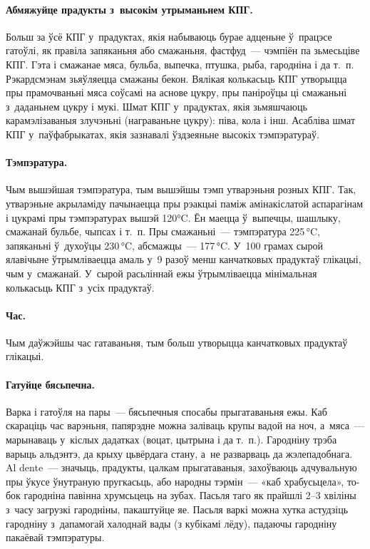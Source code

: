 \paragraph{Абмяжуйце прадукты з~высокім утрыманьнем КПГ.}
Больш за ўсё КПГ у~прадуктах, якія набываюць бурае адценьне ў~працэсе гатоўлі, як правіла запяканьня або смажаньня, фастфуд~--- чэмпіён па зьмесьціве КПГ. Гэта і смажанае мяса, бульба, выпечка, птушка, рыба, гародніна і да т.~п. Рэкардсмэнам зьяўляецца смажаны бекон. Вялікая колькасьць КПГ утворыцца пры прамочваньні мяса соўсамі на аснове цукру, пры паніроўцы ці смажаньні з~даданьнем цукру і мукі. Шмат КПГ у~прадуктах, якія зьмяшчаюць карамэлізаваныя злучэньні (награваньне цукру): піва, кола і інш. Асабліва шмат КПГ у~паўфабрыкатах, якія зазнавалі ўздзеяньне высокіх тэмпэратураў.

\paragraph{Тэмпэратура.}
Чым вышэйшая тэмпэратура, тым вышэйшы тэмп утварэньня розных КПГ. Так, утварэньне акрыламіду пачынаецца пры рэакцыі паміж амінакіслатой аспарагінам і цукрамі пры тэмпэратурах вышэй 120°C. Ён маецца ў~выпечцы, шашлыку, смажанай бульбе, чыпсах і т.~п. Пры смажаньні~--- тэмпэратура 225\,°C, запяканьні ў~духоўцы 230\,°C, абсмажцы~--- 177\,°C. У~100 грамах сырой ялавічыне ўтрымліваецца амаль у~9 разоў менш канчатковых прадуктаў глікацыі, чым у~смажанай. У~сырой расьліннай ежы ўтрымліваецца мінімальная колькасьць КПГ з~усіх прадуктаў.

\paragraph{Час.}
Чым даўжэйшы час гатаваньня, тым больш утворыцца канчатковых прадуктаў глікацыі.


\paragraph{Гатуйце бясьпечна.}
Варка і гатоўля на пары~--- бясьпечныя спосабы прыгатаваньня ежы. Каб скараціць час варэньня, папярэдне можна заліваць крупы вадой на ноч, а~мяса~--- марынаваць у~кіслых дадатках (воцат, цытрына і да т.~п.). Гародніну трэба варыць альдэнтэ, да крыху цьвёрдага стану, а~не разварваць да жэлепадобнага. Al dente~--- значыць, прадукты, цалкам прыгатаваныя, захоўваюць адчувальную пры ўкусе ўнутраную пругкасьць, або народны тэрмін~--- «каб храбусьцела», то-бок гародніна павінна хрумсьцець на зубах. Пасьля таго як прайшлі 2--3 хвіліны з~часу загрузкі гародніны, пакаштуйце яе. Пасьля варкі можна хутка астудзіць гародніну з~дапамогай халоднай вады (з кубікамі лёду), падаючы гародніну пакаёвай тэмпэратуры.

